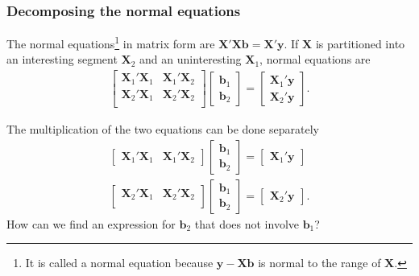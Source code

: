 \documentclass[a4paper,12pt]{article}
\begin{document}
\subsubsection*{Decomposing the normal equations}

The normal equations\footnote{It is called a normal equation because $\bm{y}-\bm{X}\bm{b}$ is normal to the range of $\bm{X}$.} in matrix form are $\bm{X}'\bm{X}\bm{b} = \bm{X}'\bm{y}$. If $\bm{X}$ is partitioned into an interesting segment $\bm{X}_2$ and an uninteresting $\bm{X}_1$, normal equations are
\begin{eqnarray}
\begin{bmatrix}
\bm{X}_1'\bm{X}_1 & \bm{X}_1'\bm{X}_2\\
\bm{X}_2'\bm{X}_1 & \bm{X}_2'\bm{X}_2\\
\end{bmatrix}
\begin{bmatrix}
\bm{b}_1\\
\bm{b}_2
\end{bmatrix}=\begin{bmatrix}
\bm{X}_1'\bm{y}\\
\bm{X}_2'\bm{y}
\end{bmatrix}.\nonumber
\end{eqnarray}

The multiplication of the two equations can be done separately
\begin{eqnarray}
\begin{bmatrix}
\bm{X}_1'\bm{X}_1 & \bm{X}_1'\bm{X}_2
\end{bmatrix}
\begin{bmatrix}
\bm{b}_1\\
\bm{b}_2
\end{bmatrix}=\begin{bmatrix}
\bm{X}_1'\bm{y}
\end{bmatrix}\label{first_b1_b2}\\
\begin{bmatrix}
\bm{X}_2'\bm{X}_1 & \bm{X}_2'\bm{X}_2\\
\end{bmatrix}
\begin{bmatrix}
\bm{b}_1\\
\bm{b}_2
\end{bmatrix}=\begin{bmatrix}
\bm{X}_2'\bm{y}
\end{bmatrix}.\label{second_b1_b2}
\end{eqnarray}
How can we find an expression for $\bm{b}_2$ that does not involve $\bm{b}_1$?
\end{document}

